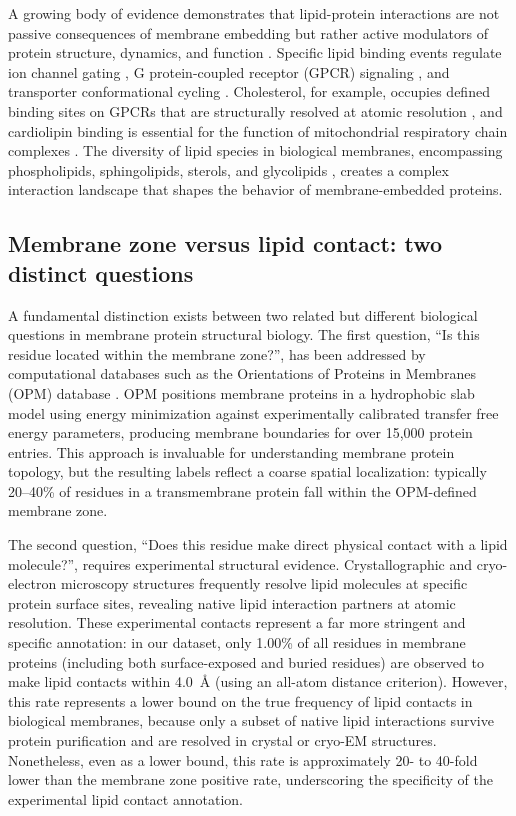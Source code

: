 \documentclass[unnumsec,webpdf,contemporary,large]{oup-authoring-template}
\begin{document}
A growing body of evidence demonstrates that lipid-protein interactions are not passive consequences of membrane embedding but rather active modulators of protein structure, dynamics, and function \cite{corradi2019, laganowsky2014}. Specific lipid binding events regulate ion channel gating \cite{duncan2020}, G protein-coupled receptor (GPCR) signaling \cite{corradi2019}, and transporter conformational cycling \cite{lee2004}. Cholesterol, for example, occupies defined binding sites on GPCRs that are structurally resolved at atomic resolution \cite{hanson2008}, and cardiolipin binding is essential for the function of mitochondrial respiratory chain complexes \cite{contreras2011}. The diversity of lipid species in biological membranes, encompassing phospholipids, sphingolipids, sterols, and glycolipids \cite{harayama2018, vanmeer2008}, creates a complex interaction landscape that shapes the behavior of membrane-embedded proteins.

\subsection{Membrane zone versus lipid contact: two distinct questions}

A fundamental distinction exists between two related but different biological questions in membrane protein structural biology. The first question, ``Is this residue located within the membrane zone?'', has been addressed by computational databases such as the Orientations of Proteins in Membranes (OPM) database \cite{lomize2012, lomize2006}. OPM positions membrane proteins in a hydrophobic slab model using energy minimization against experimentally calibrated transfer free energy parameters, producing membrane boundaries for over 15,000 protein entries. This approach is invaluable for understanding membrane protein topology, but the resulting labels reflect a coarse spatial localization: typically 20--40\% of residues in a transmembrane protein fall within the OPM-defined membrane zone.

The second question, ``Does this residue make direct physical contact with a lipid molecule?'', requires experimental structural evidence. Crystallographic and cryo-electron microscopy structures frequently resolve lipid molecules at specific protein surface sites, revealing native lipid interaction partners at atomic resolution. These experimental contacts represent a far more stringent and specific annotation: in our dataset, only 1.00\% of all residues in membrane proteins (including both surface-exposed and buried residues) are observed to make lipid contacts within 4.0~\AA{} (using an all-atom distance criterion). However, this rate represents a lower bound on the true frequency of lipid contacts in biological membranes, because only a subset of native lipid interactions survive protein purification and are resolved in crystal or cryo-EM structures. Nonetheless, even as a lower bound, this rate is approximately 20- to 40-fold lower than the membrane zone positive rate, underscoring the specificity of the experimental lipid contact annotation.
\end{document}
